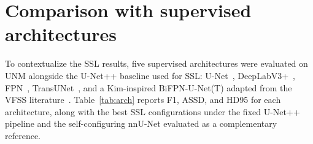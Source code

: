 \documentclass[
  msc,
  american
]{ThesisPUC_v2}
\begin{document}
\FloatBarrier

\section{Comparison with supervised architectures}
\label{sec:results-archs}

To contextualize the SSL results, five supervised architectures were evaluated on UNM alongside the U-Net++ baseline used for SSL: U-Net~\citep{ref_unet}, DeepLabV3+~\citep{ref_deeplabv3plus}, FPN~\citep{ref_fpn}, TransUNet~\citep{ref_transunet}, and a Kim-inspired BiFPN-U-Net(T) adapted from the VFSS literature~\citep{ref_kim2021}. Table~\ref{tab:arch} reports F1, ASSD, and HD95 for each architecture, along with the best SSL configurations under the fixed U-Net++ pipeline and the self-configuring nnU-Net evaluated as a complementary reference.
\end{document}
